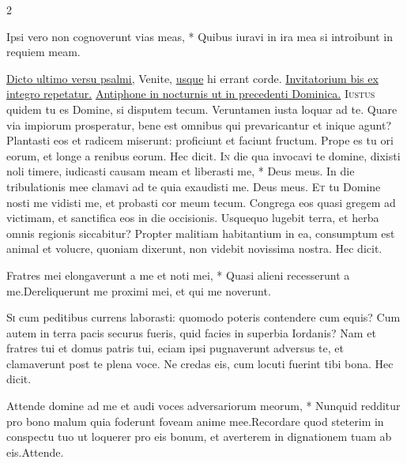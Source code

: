 \begin{multicols*}{2}
\begin{invitatory}
{Ipsi vero non cognoverunt vias meas, * Quibus iuravi in ira mea si introibunt in requiem meam.}
\end{invitatory}
\newline \ul{Dicto ultimo versu psalmi,} Venite, \ul{usque} hi errant corde. \ul{Invitatorium bis ex integro repetatur.}
\newline \ul{Antiphone in nocturnis ut in precedenti Dominica.}
\lettrine[lines=2]{\zallmancaps \color{Red} I}{ustus} quidem tu es Domine, si disputem tecum. Veruntamen iusta loquar ad te. Quare via impiorum prosperatur, bene est omnibus qui prevaricantur et inique agunt? Plantasti eos et radicem miserunt: proficiunt et faciunt fructum. Prope es tu ori eorum, et longe a renibus eorum. Hec dicit. \R
\lettrine[lines=2]{\zallmancaps \color{Blue} I}{n} \hypertarget{in-die-qua}{\label{in-die-qua}} die qua invocavi te domine, dixisti noli timere, iudicasti causam meam et liberasti me, * Deus meus. \V In die tribulationis mee clamavi ad te quia exaudisti me. Deus meus.
\lettrine[lines=2]{\zallmancaps \color{Red} E}{t} tu Domine nosti me vidisti me, et probasti cor meum tecum. Congrega eos quasi gregem ad victimam, et sanctifica eos in die occisionis. Usquequo lugebit terra, et herba omnis regionis siccabitur? Propter malitiam habitantium in ea, consumptum est animal et volucre, quoniam dixerunt, non videbit novissima nostra. Hec dicit.
\begin{responsory}
{Fratres mei elongaverunt a me et noti mei, * Quasi alieni recesserunt a me.}{Dereliquerunt me proximi mei, et qui me noverunt.}%
\end{responsory}%
\lettrine[lines=2]{\zallmancaps \color{Blue} S}{i} cum peditibus currens laborasti: quomodo poteris contendere cum equis? Cum autem in terra pacis securus fueris, quid facies in superbia Iordanis? Nam et fratres tui et domus patris tui, eciam ipsi pugnaverunt adversus te, et clamaverunt post te plena voce. Ne credas eis, cum locuti fuerint tibi bona. Hec dicit.
\begin{responsory}
{Attende domine ad me et audi voces adversariorum meorum, * Nunquid redditur pro bono malum quia foderunt foveam anime mee.}{Recordare quod steterim in conspectu tuo ut loquerer pro eis bonum, et averterem in dignationem tuam ab eis.}Attende.

\end{responsory}
\end{multicols*}
